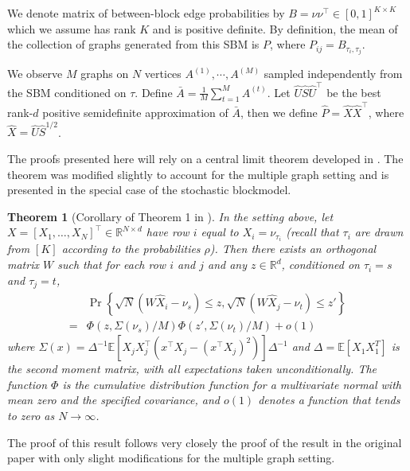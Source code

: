 \documentclass[journal,twoside,web]{ieeecolor}
\newtheorem{theorem}[fact]{Theorem}
\renewcommand{\Re}{\mathbb{R}}
\newcommand{\Ex}{\mathbb{E}}
\begin{document}
We denote matrix of between-block edge probabilities by $B = \nu \nu^{\top} \in[0,1]^{K\times K}$ which we assume has rank $K$ and is positive definite.
By definition, the mean of the collection of graphs generated from this SBM is $P$, where $P_{ij} = B_{\tau_i, \tau_j}$.

We observe $M$ graphs on $N$ vertices $A^{(1)}, \cdots, A^{(M)}$ sampled independently from the SBM conditioned on $\tau$.
Define $\bar{A} = \frac{1}{M} \sum_{t=1}^M A^{(t)}$. Let $\hat{U} \hat{S} \hat{U}^{\top}$ be the best rank-$d$ positive semidefinite approximation of $\bar{A}$, then we define $\hat{P} = \hat{X} \hat{X}^{\top}$, where $\hat{X} = \hat{U} \hat{S}^{1/2}$.




The proofs presented here will rely on a central limit theorem developed in .
The theorem was modified slightly to account for the multiple graph setting and is presented in the special case of the stochastic blockmodel.

\begin{theorem}[Corollary of Theorem 1 in ]\label{thm:clt_ext}
  In the setting above, let $X=[X_1,\dotsc,X_N]^{\top}\in\Re^{N\times d}$ have row $i$ equal to $X_i=\nu_{\tau_i}$ (recall that $\tau_i$ are drawn from $[K]$ according to the probabilities $\rho$).
	Then there exists an orthogonal matrix $W$ such that for each row $i$ and $j$ and any $z \in \Re^{d}$, conditioned on $\tau_i=s$ and $\tau_j=t$,
  \begin{equation}
    \label{eq:4}
    \begin{split}
    &\Pr\left\{\sqrt{N}( W \hat{X}_i - \nu_s ) \leq z, \sqrt{N}( W \hat{X}_j - \nu_t) \leq z'\right\}\\
    =&  \Phi(z, \Sigma(\nu_s)/M)  \Phi(z', \Sigma(\nu_t)/M) +o(1)\end{split}
  \end{equation}
  where $\Sigma(x) =\Delta^{-1}\Ex[ X_j X_j^\top(x^\top X_j -(x^\top
  X_j)^2)]\Delta^{-1}$ and $\Delta=\Ex[ X_1 X_{1}^{T}]$ is the second
  moment matrix, with all expectations taken unconditionally.
  The function $\Phi$ is the cumulative distribution function for a multivariate normal with mean zero and the specified covariance, and $o(1)$ denotes a function that tends to zero as $N\to \infty$.
\end{theorem}
The proof of this result follows very closely the proof of the result in the original paper with only slight modifications for the multiple graph setting.
\end{document}
